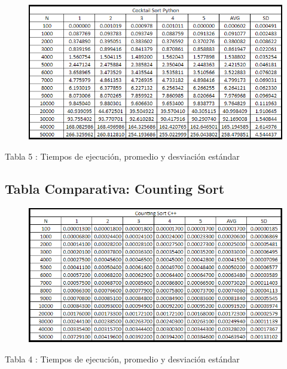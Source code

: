 \documentclass[https://www.overleaf.com/project/63761df255a8a9f4a15c3579
	letterpaper, %
	10pt, %
]{CSUniSchoolLabReport}
\begin{document}
\begin{figure}[H] 
	\centering 
	\includegraphics[width=1\textwidth]{Figures/3.png} %
\end{figure}
\begin{center}
    Tabla 5 : Tiempos de ejecución, promedio y desviación estándar
\end{center}

\subsection{Tabla Comparativa: Counting Sort}

\begin{figure}[H] 
	\centering 
	\includegraphics[width=1\textwidth]{Figures/4.png} %
\end{figure}
\begin{center}
    Tabla 4 : Tiempos de ejecución, promedio y desviación estándar
\end{center}
\end{document}
